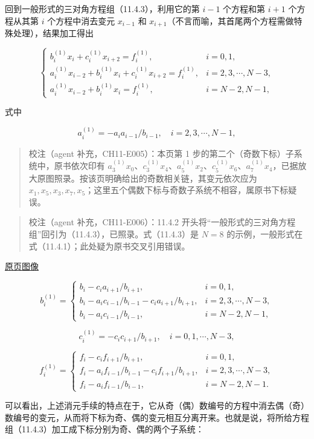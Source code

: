 \documentclass[
  10pt,
  fontset=fandol]{ctexart}
\begin{document}
回到一般形式的三对角方程组（11.4.3），利用它的第 \(i-1\) 个方程和第 \(i+1\) 个方程从其第 \(i\) 个方程中消去变元 \(x_{i-1}\) 和 \(x_{i+1}\)（不言而喻，其首尾两个方程需做特殊处理），结果加工得出

\[
\begin{cases}
b_i^{(1)}x_i+c_i^{(1)}x_{i+2}=f_i^{(1)},& i=0,1,\\
a_i^{(1)}x_{i-2}+b_i^{(1)}x_i+c_i^{(1)}x_{i+2}=f_i^{(1)},& i=2,3,\cdots,N-3,\\
a_i^{(1)}x_{i-2}+b_i^{(1)}x_i=f_i^{(1)},& i=N-2,N-1,
\end{cases}
\]

式中

\[
a_i^{(1)}=-a_i a_{i-1}/b_{i-1},\quad i=2,3,\cdots,N-1,
\]

\begin{quote}
校注（agent 补充，CH11-E005）：本页第 1 步的第二个（奇数下标）子系统中，原书依次印有 \(a_3^{(1)}x_0\)、\(c_3^{(1)}x_4\)、\(a_5^{(1)}x_2\)、\(c_5^{(1)}x_6\)、\(a_7^{(1)}x_4\)，已据放大原图照录。按该页明确给出的奇数相关链，其变元依次应为 \(x_1,x_5,x_3,x_7,x_5\)；这里五个偶数下标与奇数子系统不相容，属原书下标疑误。
\end{quote}

\begin{quote}
校注（agent 补充，CH11-E006）：11.4.2 开头将``一般形式的三对角方程组''回引为（11.4.3），已照录。式（11.4.3）是 \(N=8\) 的示例，一般形式在式（11.4.1）；此处疑为原书交叉引用错误。
\end{quote}

\href{../../source-images/pdf-291.jpeg}{原页图像}

\[
b_i^{(1)}=
\begin{cases}
b_i-c_i a_{i+1}/b_{i+1},& i=0,1,\\
b_i-a_i c_{i-1}/b_{i-1}-c_i a_{i+1}/b_{i+1},& i=2,3,\cdots,N-3,\\
b_i-a_i c_{i-1}/b_{i-1},& i=N-2,N-1,
\end{cases}
\]

\[
c_i^{(1)}=-c_i c_{i+1}/b_{i+1},\quad i=0,1,\cdots,N-3,
\]

\[
f_i^{(1)}=
\begin{cases}
f_i-c_i f_{i+1}/b_{i+1},& i=0,1,\\
f_i-a_i f_{i-1}/b_{i-1}-c_i f_{i+1}/b_{i+1},& i=2,3,\cdots,N-3,\\
f_i-a_i f_{i-1}/b_{i-1},& i=N-2,N-1.
\end{cases}
\]

可以看出，上述消元手续的特点在于，它从奇（偶）数编号的方程中消去偶（奇）数编号的变元，从而将下标为奇、偶的变元相互分离开来。也就是说，将所给方程组（11.4.3）加工成下标分别为奇、偶的两个子系统：
\end{document}
